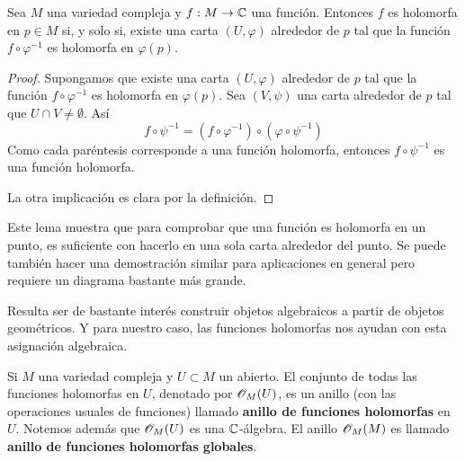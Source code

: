 \begin{lemma}
	Sea $M$ una variedad compleja y $f:M\to\mathbb{C}$ una función. Entonces $f$ es holomorfa en $p\in M$ si, y solo si, existe una carta $(U,\varphi)$ alrededor de $p$ tal que la función $f\circ \varphi^{-1}$ es holomorfa en $\varphi(p)$.
\end{lemma}
\begin{proof}
	Supongamos que existe una carta $(U,\varphi)$ alrededor de $p$ tal que la función $f\circ \varphi^{-1}$ es holomorfa en $\varphi(p)$. Sea $(V,\psi)$ una carta alrededor de $p$ tal que $U\cap V\neq \emptyset$. Así
	\begin{equation*}
		f\circ \psi^{-1}=(f\circ\varphi^{-1})\circ(\varphi\circ\psi^{-1})
	\end{equation*}
	Como cada paréntesis corresponde a una función holomorfa, entonces $f\circ \psi^{-1}$ es una función holomorfa.\\
	\begin{center}
	\end{center}
	
	La otra implicación es clara por la definición.
\end{proof}

Este lema muestra que para comprobar que una función es holomorfa en un punto, es suficiente con hacerlo en una sola carta alrededor del punto. Se puede también hacer una demostración similar para aplicaciones en general pero requiere un diagrama bastante más grande. 

Resulta ser de bastante interés construir objetos algebraicos a partir de objetos geométricos. Y para nuestro caso, las funciones holomorfas nos ayudan con esta asignación algebraica.
\begin{remark}
	Si $M$ una variedad compleja y $U\subset M$ un abierto. El conjunto de todas las funciones holomorfas en $U$, denotado por $\mathscr{O}_M(U)$, es un anillo (con las operaciones usuales de funciones) llamado \textbf{anillo de funciones holomorfas} en $U$. Notemos además que $\mathscr{O}_M(U)$ es una $\mathbb{C}$-álgebra.
	El anillo $\mathscr{O}_M(M)$ es llamado \textbf{anillo de funciones holomorfas globales}.
	
\end{remark}

